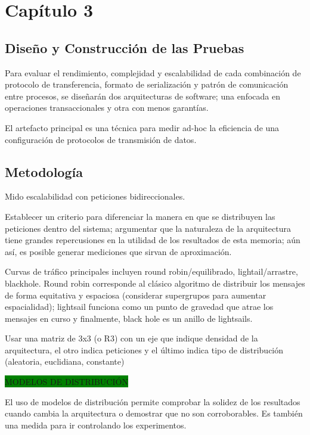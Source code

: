 \chapter{Capítulo 3}

\section{Diseño y Construcción de las Pruebas}

Para evaluar el rendimiento, complejidad y escalabilidad de cada combinación de protocolo de transferencia, formato de serialización y patrón de comunicación entre procesos, se diseñarán dos arquitecturas de software; una enfocada en operaciones transaccionales y otra con menos garantías.

El artefacto principal es una técnica para medir ad-hoc la eficiencia de una configuración de protocolos de transmisión de datos.

\section{Metodología}

Mido escalabilidad con peticiones bidireccionales.

Establecer un criterio para diferenciar la manera en que se distribuyen las peticiones dentro del sistema; argumentar que la naturaleza de la arquitectura tiene grandes repercusiones en la utilidad de los resultados de esta memoria; aún así, es posible generar mediciones que sirvan de aproximación.

Curvas de tráfico principales incluyen round robin/equilibrado, lightail/arrastre, blackhole. Round robin corresponde al clásico algoritmo de distribuir los mensajes de forma equitativa y espaciosa (considerar supergrupos para aumentar espacialidad); lightsail funciona como un punto de gravedad que atrae los mensajes en curso y finalmente, black hole es un anillo de lightsails.

Usar una matriz de 3x3 (o R3) con un eje que indique densidad de la arquitectura, el otro indica peticiones y el último indica tipo de distribución (aleatoria, euclidiana, constante)

\colorbox{green}{MODELOS DE DISTRIBUCIÓN}

El uso de modelos de distribución permite comprobar la solidez de los resultados cuando cambia la arquitectura o demostrar que no son corroborables. Es también una medida para ir controlando los experimentos.

